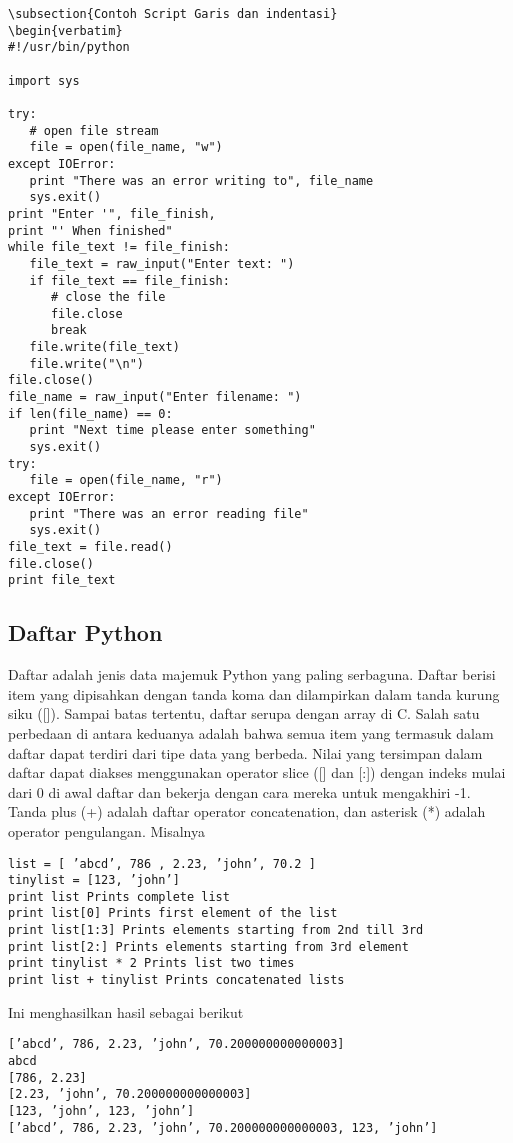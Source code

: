 \begin{enumerate}
\begin {verbatim}
\subsection{Contoh Script Garis dan indentasi}
\begin{verbatim}
#!/usr/bin/python

import sys

try:
   # open file stream
   file = open(file_name, "w")
except IOError:
   print "There was an error writing to", file_name
   sys.exit()
print "Enter '", file_finish,
print "' When finished"
while file_text != file_finish:
   file_text = raw_input("Enter text: ")
   if file_text == file_finish:
      # close the file
      file.close
      break
   file.write(file_text)
   file.write("\n")
file.close()
file_name = raw_input("Enter filename: ")
if len(file_name) == 0:
   print "Next time please enter something"
   sys.exit()
try:
   file = open(file_name, "r")
except IOError:
   print "There was an error reading file"
   sys.exit()
file_text = file.read()
file.close()
print file_text
\end{verbatim}

\subsection{Daftar Python}
Daftar adalah jenis data majemuk Python yang paling serbaguna. Daftar berisi item
yang dipisahkan dengan tanda koma dan dilampirkan dalam tanda kurung siku ([]).
Sampai batas tertentu, daftar serupa dengan array di C. Salah satu perbedaan di antara
keduanya adalah bahwa semua item yang termasuk dalam daftar dapat terdiri dari
tipe data yang berbeda.
Nilai yang tersimpan dalam daftar dapat diakses menggunakan operator slice ([] dan
[:]) dengan indeks mulai dari 0 di awal daftar dan bekerja dengan cara mereka untuk
mengakhiri -1. Tanda plus (+) adalah daftar operator concatenation, dan asterisk (*)
adalah operator pengulangan. Misalnya
\begin{verbatim}
list = [ ’abcd’, 786 , 2.23, ’john’, 70.2 ]
tinylist = [123, ’john’]
print list Prints complete list
print list[0] Prints first element of the list
print list[1:3] Prints elements starting from 2nd till 3rd
print list[2:] Prints elements starting from 3rd element
print tinylist * 2 Prints list two times
print list + tinylist Prints concatenated lists
\end{verbatim}
Ini menghasilkan hasil sebagai berikut 
\begin{verbatim}
[’abcd’, 786, 2.23, ’john’, 70.200000000000003]
abcd
[786, 2.23]
[2.23, ’john’, 70.200000000000003]
[123, ’john’, 123, ’john’]
[’abcd’, 786, 2.23, ’john’, 70.200000000000003, 123, ’john’]
\end{verbatim}


\end{enumerate}
